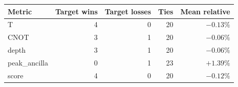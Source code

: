 \begin{tabular}{lrrrr}
\toprule
Metric & Target wins & Target losses & Ties & Mean relative \\
\midrule
T & 4 & 0 & 20 & $-0.13\%$ \\
CNOT & 3 & 1 & 20 & $-0.06\%$ \\
depth & 3 & 1 & 20 & $-0.06\%$ \\
peak_ancilla & 0 & 1 & 23 & $+1.39\%$ \\
score & 4 & 0 & 20 & $-0.12\%$ \\
\bottomrule
\end{tabular}
